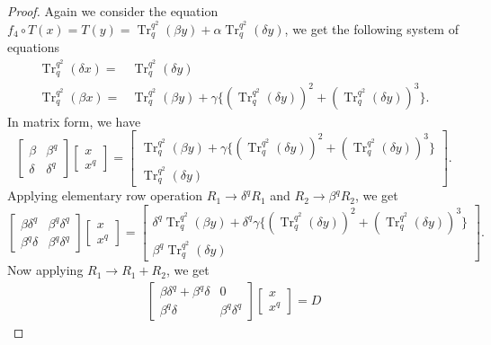 \documentclass{birkjour}
\theoremstyle{definition}
\theoremstyle{remark}
\numberwithin{equation}{section}
\begin{document}
\begin{proof}
Again we consider the equation $f_4\circ T(x)=T(y)=\operatorname{Tr}_{q}^{q^2}(\beta y)+\alpha\operatorname{Tr}_{q}^{q^2}(\delta y)$, we get the following system of equations
\begin{align*}
	\operatorname{Tr}_{q}^{q^2}(\delta x)=&\operatorname{Tr}_{q}^{q^2}(\delta y)\\
	\operatorname{Tr}_{q}^{q^2}(\beta x)=&\operatorname{Tr}_{q}^{q^2}(\beta y)+\gamma\{(\operatorname{Tr}_{q}^{q^2}(\delta y))^2+(\operatorname{Tr}_{q}^{q^2}(\delta y))^3\}.
\end{align*}
In matrix form, we have
$$\begin{bmatrix}
	\beta&\beta^{q}\\
	\delta&\delta^{q}
\end{bmatrix}
\begin{bmatrix}
	x\\x^{q}
\end{bmatrix}=
\begin{bmatrix}
	\operatorname{Tr}_{q}^{q^2}(\beta y)+\gamma\{(\operatorname{Tr}_{q}^{q^2}(\delta y))^2+(\operatorname{Tr}_{q}^{q^2}(\delta y))^3\}\\
	\operatorname{Tr}_{q}^{q^2}(\delta y)
\end{bmatrix}.$$
Applying elementary row operation $R_1\rightarrow\delta^{q}R_1$ and $R_2\rightarrow\beta^{q}R_2$, we get
$$\begin{bmatrix}
	\beta\delta^{q}&\beta^{q}\delta^{q}\\
	\beta^{q}\delta&\beta^{q}\delta^{q}
\end{bmatrix}
\begin{bmatrix}
	x\\x^{q}
\end{bmatrix}=
\begin{bmatrix}
	\delta^{q}\operatorname{Tr}_{q}^{q^2}(\beta y)+\delta^{q}\gamma\{(\operatorname{Tr}_{q}^{q^2}(\delta y))^2+(\operatorname{Tr}_{q}^{q^2}(\delta y))^3\}\\
	\beta^{q}\operatorname{Tr}_{q}^{q^2}(\delta y)
\end{bmatrix}.$$
Now applying $R_1\rightarrow R_1+R_2$, we get
\begin{align}\begin{bmatrix}
	\beta\delta^{q}+\beta^{q}\delta&0\\
	\beta^{q}\delta&\beta^{q}\delta^{q}
\end{bmatrix}
\begin{bmatrix}
	x\\x^{q}
\end{bmatrix}= D\label{4b}\end{align}

\end{proof}
\end{document}
